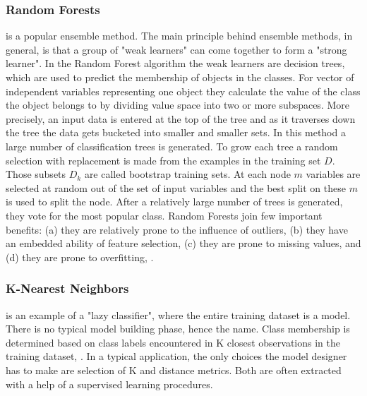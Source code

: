 \documentclass{llncs}
\begin{document}
\subsubsection{Random Forests}

is a popular ensemble method. The main principle behind ensemble methods, in general, is that a group of "weak learners" can come together to form a "strong learner". In the Random Forest algorithm the weak learners are decision trees, which are used to predict the membership of objects in the classes. For vector of independent variables representing one object they calculate the value of the class the object belongs to by dividing value space into two or more subspaces. More precisely, an input data is entered at the top of the tree and as it traverses down the tree the data gets bucketed into smaller and smaller sets. In this method a large number of classiﬁcation trees is generated. To grow each tree a random selection with replacement is made from the examples in the training set $D$. Those subsets $D_{k}$ are called bootstrap training sets. At each node $m$ variables are selected at random out of the set of input variables and the best split on these $m$ is used to split the node. After a relatively large number of trees is generated, they vote for the most popular class. Random Forests join few important benefits: (a) they are relatively prone to the influence of outliers, (b) they have an embedded ability of feature selection, (c) they are prone to missing values, and (d) they are prone to overfitting, \cite{Breiman2001}. 




\subsubsection{K-Nearest Neighbors}

is an example of a "lazy classifier", where the entire training dataset is a model. There is no typical model building phase, hence the name. Class membership is determined based on class labels encountered in K closest observations in the training dataset, \cite{Altman1992}. In a typical application, the only choices the model designer has to make are selection of K and distance metrics. Both are often extracted with a help of a supervised learning procedures.
\end{document}
